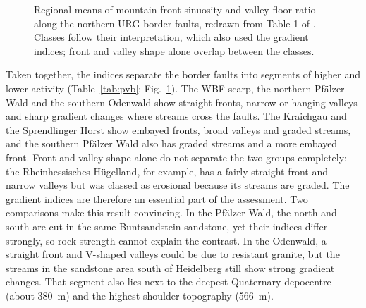 \documentclass[10pt,a4paper,twocolumn]{article}
\begin{document}
\begin{figure}[t]
\centering
{}
\caption{Regional means of mountain-front sinuosity and valley-floor ratio along the northern URG
border faults, redrawn from Table 1 of \citet{PetersVanBalen2007}. Classes follow their interpretation,
which also used the gradient indices; front and valley shape alone overlap between the classes.}
\label{fig:pvb}
\end{figure}

Taken together, the indices separate the border faults into segments of higher and lower activity
(Table~\ref{tab:pvb}; Fig.~\ref{fig:pvb}). The WBF scarp, the northern Pfälzer Wald and the southern
Odenwald show straight fronts, narrow or hanging valleys and sharp gradient changes where streams
cross the faults. The Kraichgau and the Sprendlinger Horst show embayed fronts, broad valleys and
graded streams, and the southern Pfälzer Wald also has graded streams and a more embayed front.
Front and valley shape alone do not separate the two groups completely: the Rheinhessisches
Hügelland, for example, has a fairly straight front and narrow valleys but was classed as erosional
because its streams are graded. The gradient indices are therefore an essential part of the
assessment. Two comparisons make this result convincing. In
the Pfälzer Wald, the north and south are cut in the same Buntsandstein sandstone, yet their indices
differ strongly, so rock strength cannot explain the contrast. In the Odenwald, a straight front and
V-shaped valleys could be due to resistant granite, but the streams in the sandstone area south of
Heidelberg still show strong gradient changes. That segment also lies next to the deepest Quaternary
depocentre (about 380~m) and the highest shoulder topography (566~m).
\end{document}
